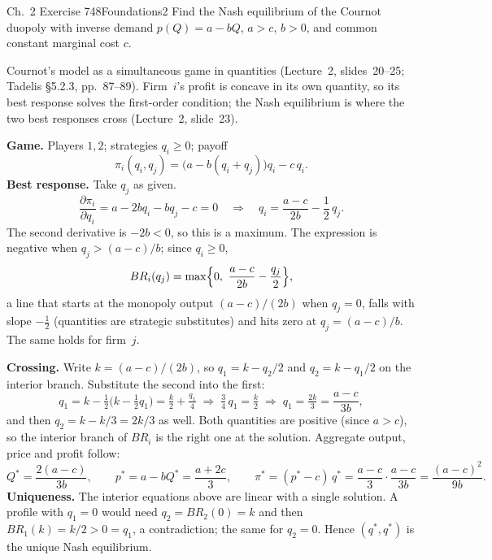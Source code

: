 \begin{exsol}{\MG{} Ch.~2 Exercise 7}{48}{Foundations}{2}
\asked Find the Nash equilibrium of the Cournot duopoly with inverse demand $p(Q) = a - bQ$,
$a > c$, $b > 0$, and common constant marginal cost $c$.

\method Cournot's model as a simultaneous game in quantities (Lecture~2, slides~20--25;
Tadelis \S5.2.3, pp.~87--89). Firm~$i$'s profit is concave in its own quantity, so its best
response solves the first-order condition; the Nash equilibrium is where the two best responses
cross (Lecture~2, slide~23).

\solution
\textbf{Game.} Players $1, 2$; strategies $q_i \ge 0$; payoff
\[
  \pi_i(q_i, q_j) = \bigl(a - b(q_i + q_j)\bigr) q_i - c\, q_i .
\]
\textbf{Best response.} Take $q_j$ as given.
\[
  \frac{\partial \pi_i}{\partial q_i} = a - 2b q_i - b q_j - c = 0
  \quad\Longrightarrow\quad
  q_i = \frac{a - c}{2b} - \frac12\, q_j .
\]
The second derivative is $-2b < 0$, so this is a maximum. The expression is negative when
$q_j > (a - c)/b$; since $q_i \ge 0$,
\[
  BR_i(q_j) = \max\Bigl\{0,\ \frac{a - c}{2b} - \frac{q_j}{2}\Bigr\},
\]
a line that starts at the monopoly output $(a - c)/(2b)$ when $q_j = 0$, falls with slope $-\tfrac12$
(quantities are strategic substitutes) and hits zero at $q_j = (a-c)/b$. The same holds for firm~$j$.

\textbf{Crossing.} Write $k = (a - c)/(2b)$, so $q_1 = k - q_2/2$ and $q_2 = k - q_1/2$ on the
interior branch. Substitute the second into the first:
\[
  q_1 = k - \tfrac12\bigl(k - \tfrac12 q_1\bigr) = \tfrac k2 + \tfrac{q_1}{4}
  \;\Longrightarrow\; \tfrac34\, q_1 = \tfrac k2
  \;\Longrightarrow\; q_1 = \tfrac{2k}{3} = \frac{a - c}{3b},
\]
and then $q_2 = k - k/3 = 2k/3$ as well. Both quantities are positive (since $a > c$), so the
interior branch of $BR_i$ is the right one at the solution. Aggregate output, price and profit follow:
\[
  Q^* = \frac{2(a - c)}{3b}, \qquad
  p^* = a - bQ^* = \frac{a + 2c}{3}, \qquad
  \pi^* = (p^* - c)\,q^* = \frac{a - c}{3}\cdot\frac{a - c}{3b} = \frac{(a - c)^2}{9b}.
\]
\textbf{Uniqueness.} The interior equations above are linear with a single solution. A profile with
$q_1 = 0$ would need $q_2 = BR_2(0) = k$ and then $BR_1(k) = k/2 > 0 = q_1$, a contradiction; the
same for $q_2 = 0$. Hence $(q^*, q^*)$ is the unique Nash equilibrium.


\end{exsol}
